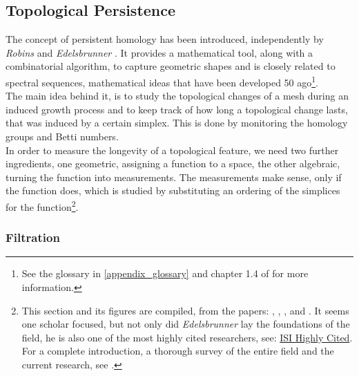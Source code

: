 \subsection{Topological Persistence}
\label{math_topological_persistance}

The concept of persistent homology has been introduced, independently by \textit{Robins} \citep[][]{Robins1999} and \textit{Edelsbrunner} \citep[cf.][]{Edelsbrunner2000}.
It provides a mathematical tool, along with a combinatorial algorithm, to capture geometric shapes and is closely related to spectral sequences, mathematical ideas that have been developed 50 ago\footnote{ See the glossary in \ref{appendix_glossary} and chapter 1.4 of \citep[][]{Zomorodian2005} for more information.}.\\
The main idea behind it, is to study the topological changes of a mesh during an induced growth process and to keep track of how long a topological change lasts, that was induced by a  certain simplex.
This is done by monitoring the homology groups and Betti numbers.\\
In order to measure the longevity of a topological feature, we need two further ingredients, one geometric, assigning a function to a space, the other algebraic, turning the function into measurements.
The measurements make sense, only if the function does, which is studied by substituting an ordering of the simplices for the function\footnote{ This section and its figures are compiled, from the papers: \citep[cf.][]{Delfinado1995}, \citep[cf.][]{Edelsbrunner2000}, \citep[cf.][]{Edelsbrunner2001}, \citep[cf.][]{Zomorodian2008} and \citep[cf.][]{Edelsbrunner2006}. It seems one scholar focused, but not only did \textit{Edelsbrunner} lay the foundations of the field, he is also one of the most highly cited researchers, see: \href{http://researchanalytics.thomsonreuters.com/highlycited/categories/computer_science/}{ISI Highly Cited}. For a complete introduction, a thorough survey of the entire field and the current research, see \citep[][]{Kozlov2008}.}.

\subsubsection{Filtration}
\label{math_filtration}

